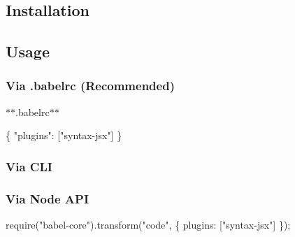 \subsection*{Installation}




\subsection*{Usage}

\subsubsection*{Via {\ttfamily .babelrc} (Recommended)}

$\ast$$\ast$.babelrc$\ast$$\ast$


\begin{DoxyCode}
\{
  "plugins": ["syntax-jsx"]
\}
\end{DoxyCode}


\subsubsection*{Via C\+LI}




\subsubsection*{Via Node A\+PI}


\begin{DoxyCode}
require("babel-core").transform("code", \{
  plugins: ["syntax-jsx"]
\});
\end{DoxyCode}
 